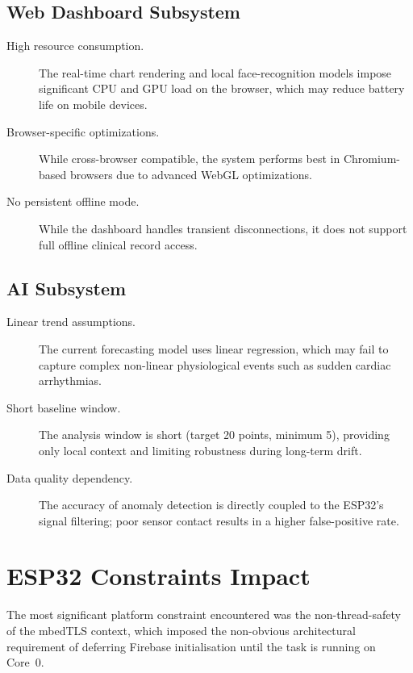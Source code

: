 \subsection{Web Dashboard Subsystem}
\begin{description}
	\item[High resource consumption.] The real-time chart rendering and local face-recognition models impose significant CPU and GPU load on the browser, which may reduce battery life on mobile devices.
	\item[Browser-specific optimizations.] While cross-browser compatible, the system performs best in Chromium-based browsers due to advanced WebGL optimizations.
	\item[No persistent offline mode.] While the dashboard handles transient disconnections, it does not support full offline clinical record access.
\end{description}

\subsection{AI Subsystem}
\begin{description}
	\item[Linear trend assumptions.] The current forecasting model uses linear regression, which may fail to capture complex non-linear physiological events such as sudden cardiac arrhythmias.
	\item[Short baseline window.] The analysis window is short (target 20 points, minimum 5), providing only local context and limiting robustness during long-term drift.
	\item[Data quality dependency.] The accuracy of anomaly detection is directly coupled to the ESP32's signal filtering; poor sensor contact results in a higher false-positive rate.
\end{description}

\section{ESP32 Constraints Impact}

The most significant platform constraint encountered was the non-thread-safety of
the mbedTLS context, which imposed the non-obvious architectural requirement of
deferring Firebase initialisation until the task is running on Core~0.

